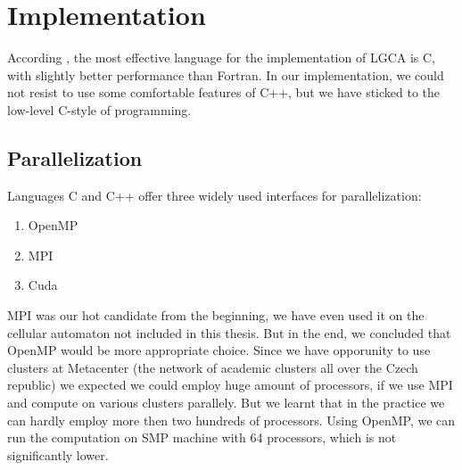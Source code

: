 \chapter{Implementation}

According \cite{wolf}, the most effective language for the implementation of LGCA is C, with slightly better performance than Fortran.
In our implementation, we could not resist to use some comfortable features of C++, but we have sticked to the low-level C-style of programming.
\bigskip

%



\section{Parallelization}
Languages C and C++ offer three widely used interfaces for parallelization:
\begin{enumerate}
\item OpenMP
\item MPI
\item Cuda
\end{enumerate}
%

\bigskip

MPI was our hot candidate from the beginning, we have even used it on the cellular automaton not included in this thesis. 
But in the end, we concluded that OpenMP would be more appropriate choice.
Since we have opporunity to use clusters at Metacenter (the network of academic clusters all over the Czech republic) we expected we could employ huge amount of processors, if we use MPI and compute on various clusters parallely. But we learnt that in the practice we can hardly employ more then two hundreds of processors.
Using OpenMP, we can run the computation on SMP machine with 64 processors, which is not significantly lower.

